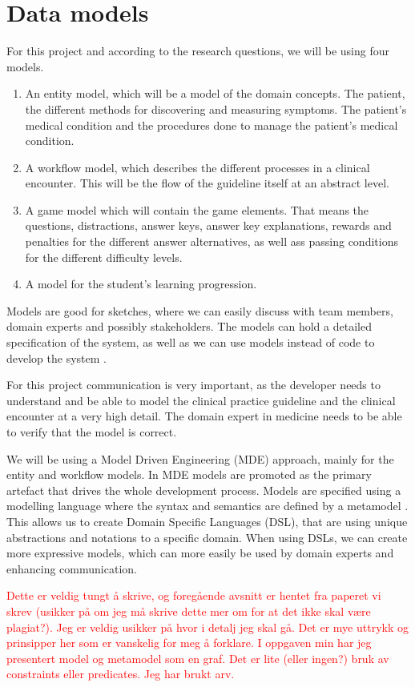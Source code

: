 \section{Data models}
For this project and according to the research questions, we will be using four models.
\begin{enumerate}
	\item An entity model, which will be a model of the domain concepts. The patient, the different methods for discovering and measuring symptoms. The patient's medical condition and the procedures done to manage the patient's medical condition.
	\item A workflow model, which describes the different processes in a clinical encounter. This will be the flow of the guideline itself at an abstract level.
	\item A game model which will contain the game elements. That means the questions, distractions, answer keys, answer key explanations, rewards and penalties for the different answer alternatives, as well ass passing conditions for the different difficulty levels.
	\item A model for the student's learning progression.
\end{enumerate}

Models are good for sketches, where we can easily discuss with team members, domain experts and possibly stakeholders. The models can hold a detailed specification of the system, as well as we can use models instead of code to develop the system \parencite{Brambilla2017}.

For this project communication is very important, as the developer needs to understand and be able to model the clinical practice guideline and the clinical encounter at a very high detail. The domain expert in medicine needs to be able to verify that the model is correct.


We will be using a Model Driven Engineering (MDE) approach, mainly for the entity and workflow models. In MDE models are promoted as the primary artefact that drives the whole development process. Models are specified using a modelling language where the syntax and semantics are defined by a metamodel \parencite{RodriguesdaSilva2015}. This allows us to create Domain Specific Languages (DSL), that are using unique abstractions and notations to a specific domain. When using DSLs, we can create more expressive models, which can more easily be used by domain experts and enhancing communication. 

\textcolor{red}{Dette er veldig tungt å skrive, og foregående avsnitt er hentet fra paperet vi skrev (usikker på om jeg må skrive dette mer om for at det ikke skal være plagiat?). Jeg er veldig usikker på hvor i detalj jeg skal gå. Det er mye uttrykk og prinsipper her som er vanskelig for meg å forklare. I oppgaven min har jeg presentert model og metamodel som en graf. Det er lite (eller ingen?) bruk av constraints eller predicates. Jeg har brukt arv.}


